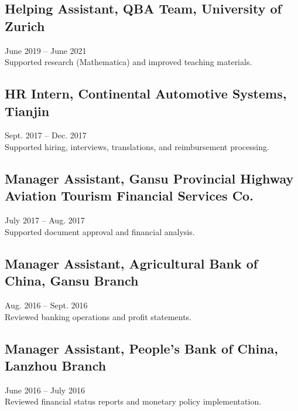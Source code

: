 \documentclass[11pt,a4paper]{article}
\begin{document}
\subsection*{Helping Assistant, QBA Team, University of Zurich}
June 2019 -- June 2021 \\
Supported research (Mathematica) and improved teaching materials.

\subsection*{HR Intern, Continental Automotive Systems, Tianjin}
Sept. 2017 -- Dec. 2017 \\
Supported hiring, interviews, translations, and reimbursement processing.

\subsection*{Manager Assistant, Gansu Provincial Highway Aviation Tourism Financial Services Co.}
July 2017 -- Aug. 2017 \\
Supported document approval and financial analysis.

\subsection*{Manager Assistant, Agricultural Bank of China, Gansu Branch}
Aug. 2016 -- Sept. 2016 \\
Reviewed banking operations and profit statements.

\subsection*{Manager Assistant, People’s Bank of China, Lanzhou Branch}
June 2016 -- July 2016 \\
Reviewed financial status reports and monetary policy implementation.

\end{document}
